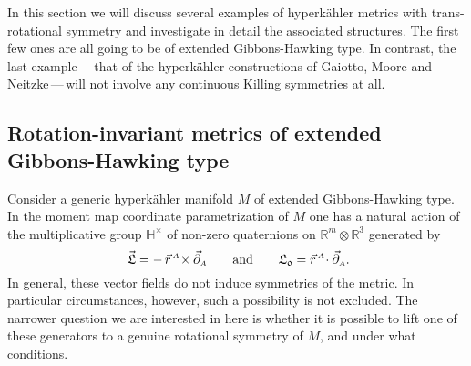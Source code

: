 \documentclass[11pt]{amsart}
\theoremstyle{remark}
\theoremstyle{remark}
\theoremstyle{definition}
\theoremstyle{definition}
\theoremstyle{definition}
\newcommand{\0}{{\scriptstyle 0'}} %
\newcommand{\1}{{\scriptstyle 1'}}
\newcommand{\A}{{\scriptscriptstyle A}} %
\begin{document}
In this section we will discuss several examples of hyperk\"ahler metrics with trans-rotational symmetry and investigate in detail the associated structures. The first few ones are all going to be of extended Gibbons-Hawking type. In contrast, the last example\,---\,that of the hyperk\"ahler constructions of Gaiotto, Moore and Neitzke\,---\,will not involve any continuous Killing symmetries at all.


\subsection{Rotation-invariant metrics of extended Gibbons-Hawking type} \label{ssec:rot-inv-L} \hfill \medskip


Consider a generic hyperk\"ahler manifold $M$ of extended Gibbons-Hawking type. In the moment map coordinate parametrization of $M$ one has a natural action of the multiplicative group $\mathbb{H}^{\times}$ of non-zero quaternions on $\mathbb{R}^m \otimes \mathbb{R}^{3}$ generated by 
\begin{equation}
\vec{\mathfrak{L}} = - \, \vec{r}^{\,\A} \!\times \vec{\partial}_{\A}
\qquad \text{and} \qquad
\mathfrak{L_0} = \vec{r}^{\,\A} \!\cdot \vec{\partial}_{\A} \rlap{.}
\end{equation}
In general, these vector fields do not induce symmetries of the metric. In particular circumstances, however, such a possibility is not excluded. The narrower question we are interested in here is whether it is possible to lift one of these generators to a genuine rotational symmetry of $M$, and under what conditions. 
\end{document}
